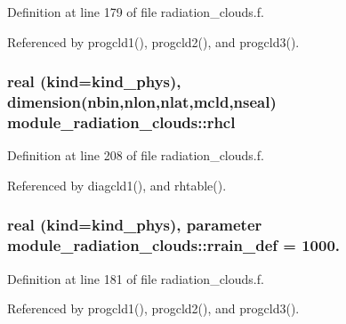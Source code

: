 Definition at line 179 of file radiation\+\_\+clouds.\+f.



Referenced by progcld1(), progcld2(), and progcld3().

\subsubsection[{\texorpdfstring{rhcl}{rhcl}}]{\setlength{\rightskip}{0pt plus 5cm}real (kind=kind\+\_\+phys), dimension({\bf nbin},{\bf nlon},{\bf nlat},{\bf mcld},{\bf nseal}) module\+\_\+radiation\+\_\+clouds\+::rhcl\hspace{0.3cm}{\ttfamily [private]}}\hypertarget{namespacemodule__radiation__clouds_a9673faf82ef00e0501763664743e3720}{}\label{namespacemodule__radiation__clouds_a9673faf82ef00e0501763664743e3720}


Definition at line 208 of file radiation\+\_\+clouds.\+f.



Referenced by diagcld1(), and rhtable().

\subsubsection[{\texorpdfstring{rrain\+\_\+def}{rrain_def}}]{\setlength{\rightskip}{0pt plus 5cm}real (kind=kind\+\_\+phys), parameter module\+\_\+radiation\+\_\+clouds\+::rrain\+\_\+def = 1000.\hspace{0.3cm}{\ttfamily [private]}}\hypertarget{namespacemodule__radiation__clouds_a93fcaedae02c0f9c4de9f39061379d6b}{}\label{namespacemodule__radiation__clouds_a93fcaedae02c0f9c4de9f39061379d6b}


Definition at line 181 of file radiation\+\_\+clouds.\+f.



Referenced by progcld1(), progcld2(), and progcld3().

